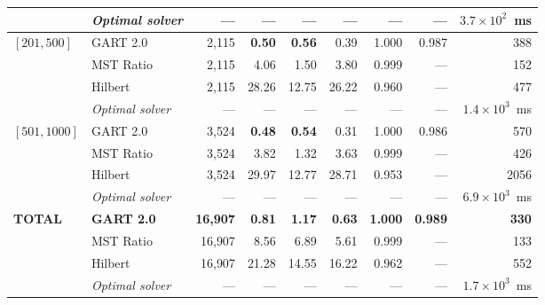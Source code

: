 \begin{table}[!ht]
{\begin{tabular}{@{}ll rrrrrrr@{}}
    & \textit{Optimal solver} & --- & --- & --- & --- & --- & --- & $3.7\times 10^{2}$~ms \\
    \midrule
    \multirow{4}{*}{$[201,500]$}
    & GART 2.0 & 2{,}115 & \textbf{0.50} & \textbf{0.56} & 0.39 & 1.000 & 0.987 & 388 \\
    & MST Ratio & 2{,}115 & 4.06 & 1.50 & 3.80 & 0.999 & --- & 152 \\
    & Hilbert & 2{,}115 & 28.26 & 12.75 & 26.22 & 0.960 & --- & 477 \\
    & \textit{Optimal solver} & --- & --- & --- & --- & --- & --- & $1.4\times 10^{3}$~ms \\
    \midrule
    \multirow{4}{*}{$[501,1000]$}
    & GART 2.0 & 3{,}524 & \textbf{0.48} & \textbf{0.54} & 0.31 & 1.000 & 0.986 & 570 \\
    & MST Ratio & 3{,}524 & 3.82 & 1.32 & 3.63 & 0.999 & --- & 426 \\
    & Hilbert & 3{,}524 & 29.97 & 12.77 & 28.71 & 0.953 & --- & 2056 \\
    & \textit{Optimal solver} & --- & --- & --- & --- & --- & --- & $6.9\times 10^{3}$~ms \\
    \midrule
    \multirow{4}{*}{\textbf{TOTAL}}
    & \textbf{GART 2.0} & \textbf{16{,}907} & \textbf{0.81} & \textbf{1.17} & \textbf{0.63} & \textbf{1.000} & \textbf{0.989} & \textbf{330} \\
    & MST Ratio & 16{,}907 & 8.56 & 6.89 & 5.61 & 0.999 & --- & 133 \\
    & Hilbert & 16{,}907 & 21.28 & 14.55 & 16.22 & 0.962 & --- & 552 \\
    & \textit{Optimal solver} & --- & --- & --- & --- & --- & --- & $1.7\times 10^{3}$~ms \\
\bottomrule
\end{tabular}%
}
\end{table}

